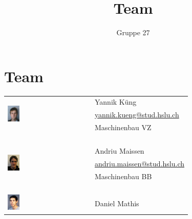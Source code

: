 \documentclass[a4paper,10pt,fleqn]{article}
\title{Team}
\author{Gruppe 27}
\begin{document}
\newcommand{\figwidth}{0.15\textwidth}

\section*{Team}

\begin{longtable}[l]{@{}p{}@{}p{}@{}}
    \\
    \multirow{3}{*}{\includegraphics[width=\figwidth]{fig/tfkueng.png}}   & Yannik Küng \\
    & \href{mailto:yannik.kueng@stud.hslu.ch}{yannik.kueng@stud.hslu.ch} \\
    & Maschinenbau VZ \\
    & \\\\\\\\
    \multirow{3}{*}{\includegraphics[width=\figwidth]{fig/mamaisse.png}} & Andriu Maissen \\
    & \href{mailto:andriu.maissen@stud.hslu.ch}{andriu.maissen@stud.hslu.ch} \\
    & Maschinenbau BB \\
    & \\\\\\\\
    \multirow{3}{*}{\includegraphics[width=\figwidth]{fig/tfmathis.png}} & Daniel Mathis \\

\end{longtable}
\end{document}
